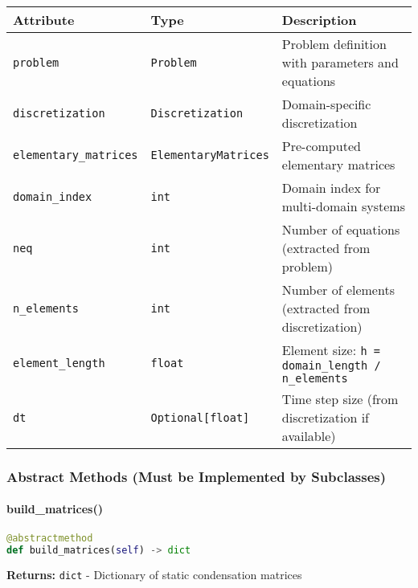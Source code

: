 \begin{longtable}{|p{3.8cm}|p{3.5cm}|p{7cm}|}
\hline
\textbf{Attribute} & \textbf{Type} & \textbf{Description} \\
\hline
\endhead

\texttt{problem} & \texttt{Problem} & Problem definition with parameters and equations \\
\hline

\texttt{discretization} & \texttt{Discretization} & Domain-specific discretization \\
\hline

\texttt{elementary\_matrices} & \texttt{ElementaryMatrices} & Pre-computed elementary matrices \\
\hline

\texttt{domain\_index} & \texttt{int} & Domain index for multi-domain systems \\
\hline

\texttt{neq} & \texttt{int} & Number of equations (extracted from problem) \\
\hline

\texttt{n\_elements} & \texttt{int} & Number of elements (extracted from discretization) \\
\hline

\texttt{element\_length} & \texttt{float} & Element size: \texttt{h = domain\_length / n\_elements} \\
\hline

\texttt{dt} & \texttt{Optional[float]} & Time step size (from discretization if available) \\
\hline

\end{longtable}

\subsubsection{Abstract Methods (Must be Implemented by Subclasses)}

\paragraph{build\_matrices()}
\begin{lstlisting}[language=Python, caption=Abstract Build Matrices Method]
@abstractmethod
def build_matrices(self) -> dict
\end{lstlisting}

\textbf{Returns:} \texttt{dict} - Dictionary of static condensation matrices

